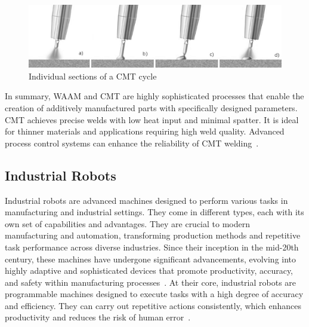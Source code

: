 \begin{figure}[H]
	\centering
	\includegraphics[width=0.9\linewidth]{figures/CMT2.png}
	\caption{Individual sections of a CMT cycle~\cite{Dalton.28102023}}
	\label{fig:CMT2}
\end{figure}


In summary, WAAM and CMT are highly sophisticated processes that enable the creation of additively manufactured parts with specifically designed parameters. CMT achieves precise welds with low heat input and minimal spatter. It is ideal for thinner materials and applications requiring high weld quality. Advanced process control systems can enhance the reliability of CMT welding~\cite{Rahul.2018, Pickin.2011}.




\subsection{Industrial Robots}\label{IR}
Industrial robots are advanced machines designed to perform various tasks in manufacturing and industrial settings. They come in different types, each with its own set of capabilities and advantages. They are crucial to modern manufacturing and automation, transforming production methods and repetitive task performance across diverse industries. Since their inception in the mid-20th century, these machines have undergone significant advancements, evolving into highly adaptive and sophisticated devices that promote productivity, accuracy, and safety within manufacturing processes~\cite{Ji.2019}.
At their core, industrial robots are programmable machines designed to execute tasks with a high degree of accuracy and efficiency. They can carry out repetitive actions consistently, which enhances productivity and reduces the risk of human error~\cite{Siciliano.2016}. 



